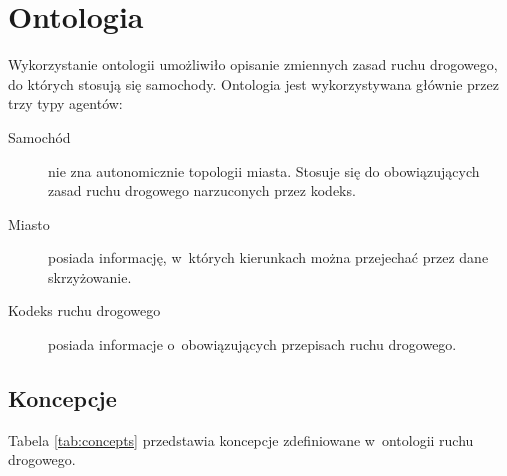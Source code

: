 \documentclass[a4paper,11pt]{article}
\begin{document}
\section{Ontologia}

Wykorzystanie ontologii umożliwiło opisanie zmiennych zasad ruchu drogowego, do których stosują się samochody. Ontologia jest wykorzystywana głównie przez trzy typy agentów:

\begin{description}
    \item[Samochód] nie zna autonomicznie topologii miasta. Stosuje się do obowiązujących zasad ruchu drogowego narzuconych przez kodeks.
    \item[Miasto] posiada informację, w~których kierunkach można przejechać przez dane skrzyżowanie.
    \item[Kodeks ruchu drogowego] posiada informacje o~obowiązujących przepisach ruchu drogowego.
\end{description}

\subsection{Koncepcje}

Tabela \ref{tab:concepts} przedstawia koncepcje zdefiniowane w~ontologii ruchu drogowego.
\end{document}

